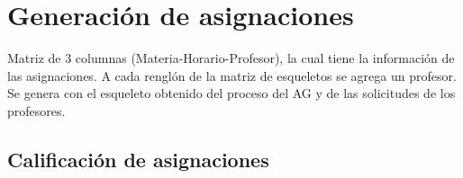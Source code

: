 \section{Generación de asignaciones}

Matriz de 3 columnas (Materia-Horario-Profesor), la cual tiene la información de las asignaciones. A cada renglón de la matriz de esqueletos se agrega un profesor. Se genera con el esqueleto obtenido del proceso del AG y de las solicitudes de los profesores.

\subsection{Calificación de asignaciones}
  
%
%
%
%

